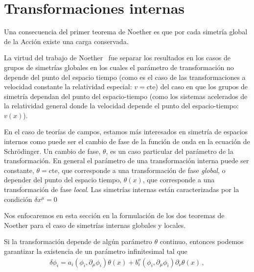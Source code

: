 \section{Transformaciones internas}

Una consecuencia del primer teorema de Noether es que por cada simetría global de la Acción existe una carga conservada. 




La virtud del trabajo de Noether~\cite{Noether,Brading:2000hc,Brading:2003nv,Sundermeyer:2014kha} fue separar los resultados  en los casos de grupos de simetrías globales en los cuales el parámetro de transformación no depende del punto del espacio tiempo (como es el caso de las transformaciones a velocidad constante la relatividad especial: $v=\text{cte}$) del caso en que los grupos de simetría dependan del punto del espacio-tiempo (como los sistemas acelerados de la relatividad general donde la velocidad depende el punto del espacio-tiempo: $v(x)$).

En el caso de teorías de campos, estamos más interesados en simetría de espacios internos como puede ser el cambio de fase de la función de onda en la ecuación de Schrödinger. Un cambio de fase, $\theta$, es un caso particular del parámetro de la transformación. En general el parámetro de una transformación interna puede ser constante, $\theta=\text{cte}$, que corresponde a una transformación de fase  \emph{global}, o depender del punto del espacio tiempo, $\theta(x)$, que corresponde  a una transformación  de fase \emph{local}. Las simetrías internas están caracterizadas por la condición $\delta x^\mu=0$ 

Nos enfocaremos en esta sección en la formulación de los dos teoremas de Noether para el caso de simetrías internas globales y locales.   


Si la transformación depende de algún parámetro $\theta$ continuo, entonces podemos garantizar la existencia de un parámetro infinitesimal tal que
\begin{align}
\label{eq:infdt}
 \delta\phi_i= a_{i}\left( \phi_{i},\partial_{\mu}\phi_{i} \right) \theta(x)+b^{\nu}_i \left( \phi_{i},\partial_{\mu}\phi_{i} \right) \partial_{\nu}\theta(x)\,,
\end{align}

